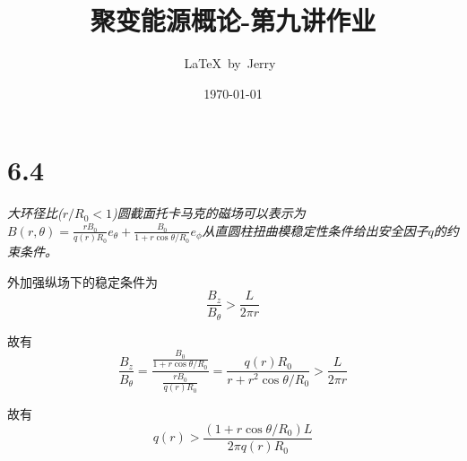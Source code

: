 \documentclass{article}
\title{聚变能源概论-第九讲作业}
\author{\LaTeX\ by\ Jerry\ }
\date{\today}
\begin{document}
\pagestyle{fancy}

\fancyhead[R]{\today}

\section*{6.4}

\emph{大环径比($r/R_0<1$)圆截面托卡马克的磁场可以表示为$B\left(r,\theta\right)=\frac{rB_{0}}{q\left(r\right)R_{0}}e_{\theta}+\frac{B_{0}}{1+r\cos\theta/R_{0}}e_{\phi}$从直圆柱扭曲模稳定性条件给出安全因子$q$的约束条件。}

外加强纵场下的稳定条件为$$\frac{B_z}{B_\theta}>\frac{L}{2\pi r}$$

故有$$\frac{B_z}{B_\theta}=\frac{\frac{B_{0}}{1+r\cos\theta/R_{0}}}{\frac{rB_{0}}{q\left(r\right)R_{0}}}=\frac{q(r)R_0}{r+r^2\cos\theta/R_0}>\frac{L}{2\pi r}$$

故有$$q(r)>\frac{(1+r\cos\theta/R_0)L}{2\pi q(r)R_0}$$
\end{document}
